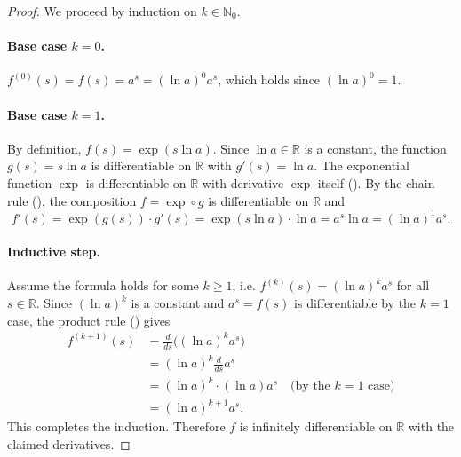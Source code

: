 \begin{proof}
We proceed by induction on $k \in \mathbb{N}_0$.

\paragraph{Base case $k = 0$.} $f^{(0)}(s) = f(s) = a^s = (\ln a)^0 a^s$, which holds since $(\ln a)^0 = 1$.

\paragraph{Base case $k = 1$.} By definition, $f(s) = \exp(s \ln a)$. Since $\ln a \in \mathbb{R}$ is a constant, the function $g(s) = s \ln a$ is differentiable on $\mathbb{R}$ with $g'(s) = \ln a$. The exponential function $\exp$ is differentiable on $\mathbb{R}$ with derivative $\exp$ itself (). By the chain rule (), the composition $f = \exp \circ g$ is differentiable on $\mathbb{R}$ and
$$f'(s) = \exp(g(s)) \cdot g'(s) = \exp(s \ln a) \cdot \ln a = a^s \ln a = (\ln a)^1 a^s.$$

\paragraph{Inductive step.} Assume the formula holds for some $k \ge 1$, i.e. $f^{(k)}(s) = (\ln a)^k a^s$ for all $s \in \mathbb{R}$. Since $(\ln a)^k$ is a constant and $a^s = f(s)$ is differentiable by the $k=1$ case, the product rule () gives
\begin{align*}
f^{(k+1)}(s) &= \frac{d}{ds} \bigl( (\ln a)^k a^s \bigr) \\
&= (\ln a)^k \frac{d}{ds} a^s \\
&= (\ln a)^k \cdot (\ln a) a^s \quad \text{(by the $k=1$ case)} \\
&= (\ln a)^{k+1} a^s.
\end{align*}
This completes the induction. Therefore $f$ is infinitely differentiable on $\mathbb{R}$ with the claimed derivatives.
\end{proof}